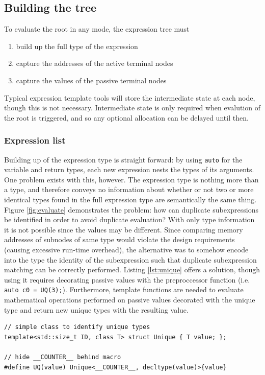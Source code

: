 \documentclass[a4paper,10pt]{article}
\begin{document}
\subsection{Building the tree}
To evaluate the root in any mode, the expression tree must
\begin{enumerate}
\item build up the full type of the expression
\item capture the addresses of the active terminal nodes
\item capture the values of the passive terminal nodes
\end{enumerate}
Typical expression template tools will store the intermediate state at each node, though this is not necessary. Intermediate state is only required when evalution of the root is triggered, and so any optional allocation can be delayed until then.

\subsubsection{Expression list}
Building up of the expression type is straight forward: by using \texttt{auto} for the variable and return types, each new expression nests the types of its arguments. One problem exists with this, however. The expression type is nothing more than a type, and therefore conveys no information about whether or not two or more identical types found in the full expression type are semantically the same thing. Figure \ref{fig:evaluate} demonstrates the problem: how can duplicate subexpressions be identified in order to avoid duplicate evaluation? With only type information it is not possible since the values may be different. Since comparing memory addresses of subnodes of same type would violate the design requirements (causing excessive run-time overhead), the alternative was to somehow encode into the type the identity of the subexpression such that duplicate subexpression matching can be correctly performed.\newline
Listing \ref{lst:unique} offers a solution, though using it requires decorating passive values with the preproccessor function (i.e. \verb$auto c0 = UQ(3);$). Furthermore, template functions are needed to evaluate mathematical operations performed on passive values decorated with the unique type and return new unique types with the resulting value.
\begin{lstlisting}[caption={\texttt{\_\_COUNTER\_\_} offers a non-standard way to distinguish variables.}, label=lst:unique]
// simple class to identify unique types
template<std::size_t ID, class T> struct Unique { T value; };

// hide __COUNTER__ behind macro
#define UQ(value) Unique<__COUNTER__, decltype(value)>{value}
\end{lstlisting}
\end{document}
